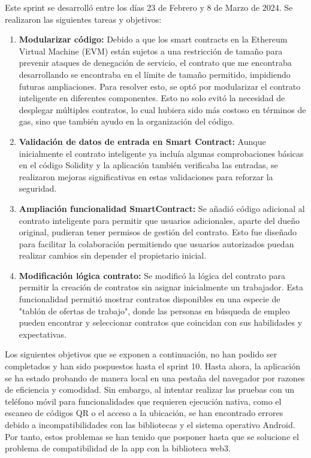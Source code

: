Este sprint se desarrolló entre los días 23 de Febrero y 8 de Marzo de 2024. Se realizaron las siguientes tareas y objetivos:

\begin{enumerate}

\item \textbf{Modularizar código:} Debido a que los smart contracts en la Ethereum Virtual Machine (EVM) están sujetos a una restricción de tamaño para prevenir ataques de denegación de servicio, el contrato que me encontraba desarrollando se encontraba en el límite de tamaño permitido, impidiendo futuras ampliaciones. 
Para resolver esto, se optó por modularizar el contrato inteligente en diferentes componentes. Esto no solo evitó la necesidad de desplegar múltiples contratos, lo cual hubiera sido más costoso en términos de gas, sino que también ayudo en la organización del código.

\item \textbf{Validación de datos de entrada en Smart Contract:} Aunque inicialmente el contrato inteligente ya incluía algunas comprobaciones básicas en el código Solidity y la aplicación también verificaba las entradas, se realizaron mejoras significativas en estas validaciones para reforzar la seguridad.

\item \textbf{Ampliación funcionalidad SmartContract:} Se añadió código adicional al contrato inteligente para permitir que usuarios adicionales, aparte del dueño original, pudieran tener permisos de gestión del contrato. Esto fue diseñado para facilitar la colaboración permitiendo que usuarios autorizados puedan realizar cambios sin depender el propietario inicial.

\item \textbf{Modificación lógica contrato:} Se modificó la lógica del contrato para permitir la creación de contratos sin asignar inicialmente un trabajador. Esta funcionalidad permitió mostrar contratos disponibles en una especie de "tablón de ofertas de trabajo", donde las personas en búsqueda de empleo pueden encontrar y seleccionar contratos que coincidan con sus habilidades y expectativas.

\end{enumerate}

Los siguientes objetivos que se exponen a continuación, no han podido ser completados y han sido pospuestos hasta el sprint 10.
Hasta ahora, la aplicación se ha estado probando de manera local en una pestaña del navegador por razones de eficiencia y comodidad. Sin embargo, al intentar realizar las pruebas con un teléfono móvil para funcionalidades que requieren ejecución nativa, como el escaneo de códigos QR o el acceso a la ubicación, se han encontrado errores debido a incompatibilidades con las bibliotecas y el sistema operativo Android.  
Por tanto, estos problemas se han tenido que posponer hasta que se solucione el problema de compatibilidad de la app con la biblioteca web3.

